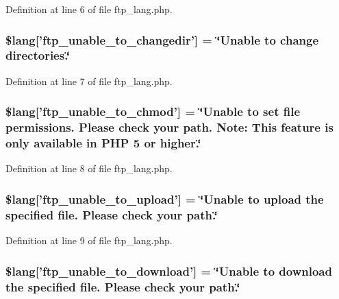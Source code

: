 Definition at line 6 of file ftp\-\_\-lang.\-php.

\subsubsection[{\$lang}]{\setlength{\rightskip}{0pt plus 5cm}\$lang['ftp\-\_\-unable\-\_\-to\-\_\-changedir'] = \char`\"{}Unable {\bf to} change directories.\char`\"{}}\label{ftp__lang_8php_a2e8eab1a2d2d33cde249097df270b7df}


Definition at line 7 of file ftp\-\_\-lang.\-php.

\subsubsection[{\$lang}]{\setlength{\rightskip}{0pt plus 5cm}\$lang['ftp\-\_\-unable\-\_\-to\-\_\-chmod'] = \char`\"{}Unable {\bf to} set file permissions. Please check your path. Note\-: This feature is only available in P\-H\-P 5 {\bf or} higher.\char`\"{}}\label{ftp__lang_8php_a9ffd10144a0dfd5a3c7ab69e4edf1fdf}


Definition at line 8 of file ftp\-\_\-lang.\-php.

\subsubsection[{\$lang}]{\setlength{\rightskip}{0pt plus 5cm}\$lang['ftp\-\_\-unable\-\_\-to\-\_\-upload'] = \char`\"{}Unable {\bf to} upload the specified file. Please check your path.\char`\"{}}\label{ftp__lang_8php_a1fd0c9f4e0f3be691a809ce804900ed7}


Definition at line 9 of file ftp\-\_\-lang.\-php.

\subsubsection[{\$lang}]{\setlength{\rightskip}{0pt plus 5cm}\$lang['ftp\-\_\-unable\-\_\-to\-\_\-download'] = \char`\"{}Unable {\bf to} download the specified file. Please check your path.\char`\"{}}\label{ftp__lang_8php_a65fa9f8b6a3da91390b36721c2a9775b}


